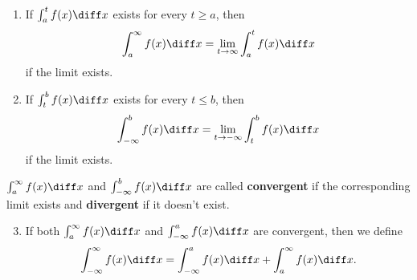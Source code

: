 \begin{frame}
\begin{definition}
\begin{enumerate}
\item  If $\int_a^t f(x) \diff x$ exists for every $t \geq a$, then
\abovedisplayskip=0pt
\belowdisplayskip=0pt
\[
\int_a^\infty f(x) \diff x = \lim_{t\rightarrow \infty} \int_a^t f(x) \diff x
\]
if the limit exists. \pause
\item  If $\int_t^b f(x) \diff x$ exists for every $t \leq b$, then
\abovedisplayskip=0pt
\belowdisplayskip=0pt
\[
\int_{-\infty}^b f(x) \diff x = \lim_{t\rightarrow -\infty} \int_t^b f(x) \diff x
\]
if the limit exists. \pause
\end{enumerate}
$\int_a^\infty f(x) \diff x$ and $\int_{-\infty}^b f(x) \diff x$ are called \textbf{convergent} if the corresponding limit exists and \textbf{divergent} if it doesn't exist. \pause
\begin{enumerate}
\setcounter{enumi}{2}
\item  If both $\int_a^\infty f(x) \diff x$ and $\int_{-\infty}^a f(x) \diff x$ are convergent, then we define
\abovedisplayskip=0pt
\belowdisplayskip=0pt
\[
\int_{-\infty}^\infty f(x) \diff x = \int_{-\infty}^a f(x) \diff x + \int_a^\infty f(x) \diff x .
\]
\end{enumerate}
\end{definition}
\end{frame}
